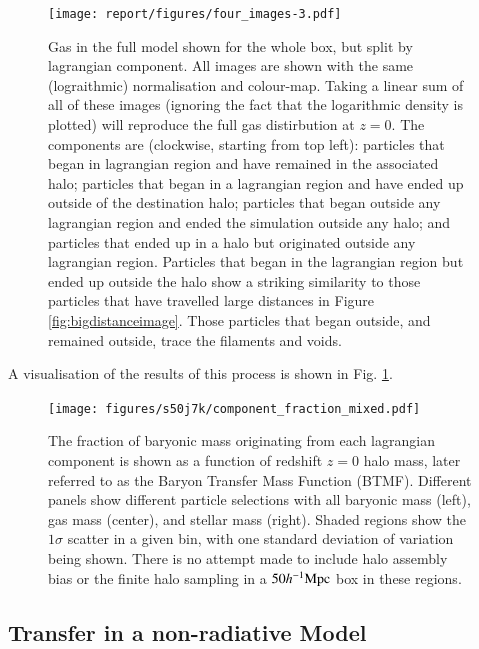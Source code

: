 \begin{figure}
    \centering
    \vspace{1cm}
    \texttt{[image: report/figures/four\_images-3.pdf]}
    \caption{Gas in the \simba{} full model shown for the whole box, but split by lagrangian
            component. All images are shown with the same (lograithmic) normalisation and 
            colour-map. Taking a linear sum of all of these images (ignoring the fact that
            the logarithmic density is plotted) will reproduce the full gas distirbution
            at $z=0$. The components are (clockwise, starting from top left): particles
            that began in lagrangian region and have remained in the associated halo;
            particles that began in a lagrangian region and have ended up outside of the
            destination halo; particles that began outside any lagrangian region and ended
            the simulation outside any halo; and particles that ended up in a halo but originated
            outside any lagrangian region. Particles that began in the lagrangian region but
            ended up outside the halo show a striking similarity to those particles that
            have travelled large distances in Figure \ref{fig:bigdistanceimage}. Those particles
            that began outside, and remained outside, trace the filaments and voids.}
    \vspace{1cm}
    \label{fig:lrtransfer}
\end{figure}

A visualisation of the results of this process is shown in Fig. \ref{fig:lrtransfer}.

\begin{figure}
	\centering
	\texttt{[image: figures/s50j7k/component\_fraction\_mixed.pdf]}
	\vspace{-0.7cm}
	\caption{
		The fraction of baryonic mass originating from each lagrangian component is
		shown as a function of redshift $z=0$ halo mass, later referred to as the
		Baryon Transfer Mass Function (BTMF). Different panels show different
		particle selections with all baryonic
		mass (left), gas mass (center), and stellar mass (right). Shaded
		regions show the $1\sigma$ scatter in a given bin, with one standard
		deviation of variation being shown. There is no attempt made to include
		halo assembly bias or the finite halo sampling in a $50h^{-1}{\rm Mpc}{}$ box in
		these regions.
	}
	\label{fig:maintransferresult}
\end{figure}

\subsection{Transfer in a non-radiative Model}

